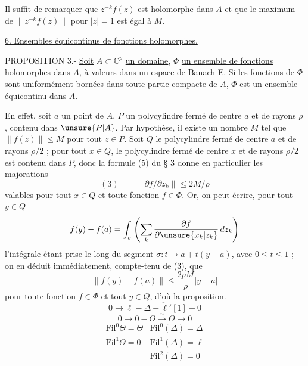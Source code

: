 Il suffit de remarquer que $z^{-k}f(z)$ est holomorphe dans $A$ et que le maximum de $\|z^{-k}f(z)\|$ pour $|z|=1$ est égal à $M$.

\uline{6. Ensembles équicontinus de fonctions holomorphes.}

PROPOSITION 3.- \uline{Soit} $A\subset\mathbb C^p$ \uline{un domaine}, $\Phi$ \uline{un ensemble de fonctions holomorphes dans} $A$, \uline{à valeurs dans un espace de Banach E}. \uline{Si les fonctions de} $\Phi$ \uline{sont uniformément bornées dans toute partie compacte de} $A$, $\Phi$ \uline{est un ensemble équicontinu dans} $A$.

En effet, soit $a$ un point de $A$, $P$ un polycylindre fermé de centre $a$ et de rayons $\rho$, contenu dans $\unsure{P|A}$. Par hypothèse, il existe un nombre $M$ tel que $\|f(z)\|\leq M$ pour tout $z\in P$. Soit $Q$ le polycylindre fermé de centre $a$ et de rayons $\rho/2$ ; pour tout $x\in Q$, le polycylindre fermé de centre $x$ et de rayons $\rho/2$ est contenu dans $P$, donc la formule (5) du § 3 donne en particulier les majorations
\[
(3)\qquad\|\partial f/\partial z_k\|\leq2M/\rho
\]
valables pour tout $x\in Q$ et toute fonction $f\in\Phi$. Or, on peut écrire, pour tout $y\in Q$
\[
f(y)-f(a)=\int_\sigma\left(\sum_k\frac{\partial f}{\partial\unsure{x_k|z_k}}\,dz_k\right)
\]
l'intégrale étant prise le long du segment $\sigma:t\longrightarrow a+t(y-a)$, avec $0\leq t\leq1$ ; on en déduit immédiatement, compte-tenu de (3), que
\[
\|f(y)-f(a)\|\leq\frac{2pM}{\rho}|y-a|
\]
pour \uline{toute} fonction $f\in\Phi$ et tout $y\in Q$, d'où la proposition.
\[
0\longrightarrow\ell\mathbin{-}\Delta\mathbin{-}\check\ell'[1]\mathbin{-}0
\]
\[
0\longrightarrow0\mathbin{-}\Theta\overset\sim\longrightarrow\Theta\longrightarrow0
\]
\[
\begin{array}{ll}
\mathrm{Fil}^0\Theta=\Theta&\mathrm{Fil}^0(\Delta)=\Delta\\
\mathrm{Fil}^1\Theta=0&\mathrm{Fil}^1(\Delta)=\ell\\
&\mathrm{Fil}^2(\Delta)=0
\end{array}
\]
\diagram{$\left.\begin{array}{rcl}\Delta&\longrightarrow&\Theta\\\ell&\longrightarrow&0\end{array}\right]\quad\text{i.e.}\quad\check\ell'[1]\longrightarrow\Theta$}

